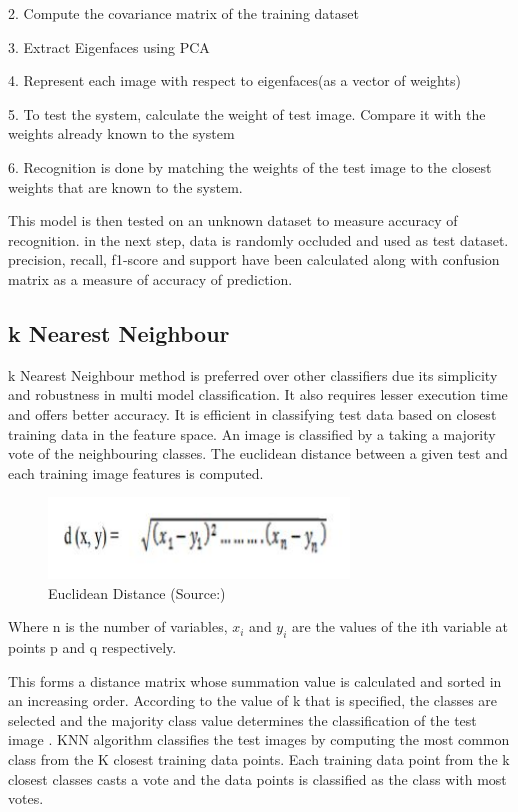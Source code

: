 \documentclass[conference]{IEEEtran}
\begin{document}
    
	2. Compute the covariance matrix of the training dataset
    
	3. Extract Eigenfaces using PCA
	
    4. Represent each image with respect to eigenfaces(as a vector of weights)

5. To test the system, calculate the weight of test image. Compare it with the weights already known to the system

6. Recognition is done by matching the weights of the test image to the closest weights that are known to the system. 

This model is then tested on an unknown dataset to measure accuracy of recognition. in the next step, data is randomly occluded and used as test dataset. precision, recall, f1-score and support have been calculated along with confusion matrix as a measure of accuracy of prediction. 

\subsection{k Nearest Neighbour}
\label{subsec:3.2 k Nearest Neighbour}
k Nearest Neighbour method is preferred over other classifiers due its simplicity and robustness in multi model classification. It also requires lesser execution time and offers better accuracy. It is efficient in classifying test data based on closest training data in the feature space. An image is classified by a taking a majority vote of the neighbouring classes. The euclidean distance between a given test and each training image features is computed. 

\begin{figure}[h!]
 \centering
 \includegraphics[width = 8cm]{euclidean_distance11.JPG}
 \caption{ Euclidean Distance (Source:\cite{weinberger2006distance})}
 \label{fig 1: Euclidean Distance}
\end{figure}

Where n is the number of variables, $x_i$ and $y_i$ are the values of the ith variable at points p and q respectively. 

This forms a distance matrix whose summation value is calculated and sorted in an increasing order. According to the value of k that is specified, the classes are selected and the majority class value determines the classification of the test image \cite{kaur2012k}. KNN algorithm classifies the test images by computing the most common class from the K closest training data points. Each training data point from the k closest classes casts a vote and the data points is classified as the class with most votes.
\end{document}
